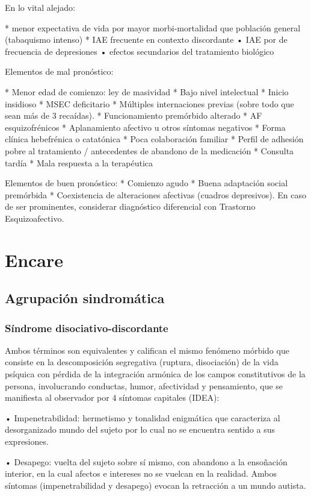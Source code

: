 En lo vital alejado:

* menor expectativa de vida por mayor morbi-mortalidad que población general (tabaquismo intenso)
* IAE frecuente en contexto discordante • IAE por de frecuencia de depresiones • efectos secundarios del tratamiento biológico

Elementos de mal pronóstico:

* Menor edad de comienzo: ley de masividad
* Bajo nivel intelectual
* Inicio insidioso
* MSEC deficitario
* Múltiples internaciones previas (sobre todo que sean más de 3 recaídas).
* Funcionamiento premórbido alterado
* AF esquizofrénicos
* Aplanamiento afectivo u otros síntomas negativos
* Forma clínica hebefrénica o catatónica
* Poca colaboración familiar
* Perfil de adhesión pobre al tratamiento / antecedentes de abandono de la medicación
* Consulta tardía
* Mala respuesta a la terapéutica

Elementos de buen pronóstico:
* Comienzo agudo
* Buena adaptación social premórbida
* Coexistencia de alteraciones afectivas (cuadros depresivos). En caso de ser prominentes, considerar diagnóstico diferencial con Trastorno Esquizoafectivo.

\section*{Encare}
\subsection*{Agrupación sindromática}
\subsubsection*{Síndrome disociativo-discordante}
Ambos términos son equivalentes y califican el mismo fenómeno mórbido que consiste en la descomposición segregativa (ruptura, disociación) de la vida psíquica con pérdida de la integración armónica de los campos constitutivos de la persona, involucrando conductas, humor, afectividad y pensamiento, que se manifiesta al observador por 4 síntomas capitales (IDEA):

• Impenetrabilidad: hermetismo y tonalidad enigmática que caracteriza al desorganizado mundo del sujeto por lo cual no se encuentra sentido a sus expresiones.

• Desapego: vuelta del sujeto sobre sí mismo, con abandono a la ensoñación interior, en la cual afectos e intereses no se vuelcan en la realidad. Ambos síntomas (impenetrabilidad y desapego) evocan la retracción a un mundo autista.

